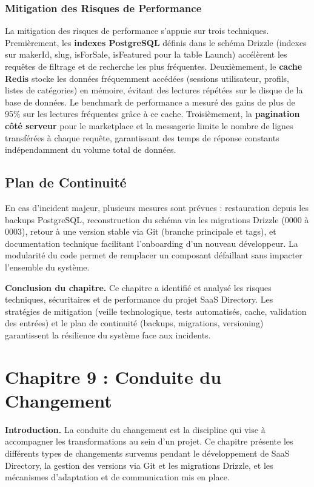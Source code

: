 \subsubsection{Mitigation des Risques de Performance}

La mitigation des risques de performance s'appuie sur trois techniques. Premièrement, les \textbf{indexes PostgreSQL} définis dans le schéma Drizzle (indexes sur makerId, slug, isForSale, isFeatured pour la table Launch) accélèrent les requêtes de filtrage et de recherche les plus fréquentes. Deuxièmement, le \textbf{cache Redis} stocke les données fréquemment accédées (sessions utilisateur, profils, listes de catégories) en mémoire, évitant des lectures répétées sur le disque de la base de données. Le benchmark de performance a mesuré des gains de plus de 95\% sur les lectures fréquentes grâce à ce cache. Troisièmement, la \textbf{pagination côté serveur} pour le marketplace et la messagerie limite le nombre de lignes transférées à chaque requête, garantissant des temps de réponse constants indépendamment du volume total de données.

\subsection{Plan de Continuité}

En cas d'incident majeur, plusieurs mesures sont prévues : restauration depuis les backups PostgreSQL, reconstruction du schéma via les migrations Drizzle (0000 à 0003), retour à une version stable via Git (branche principale et tags), et documentation technique facilitant l'onboarding d'un nouveau développeur. La modularité du code permet de remplacer un composant défaillant sans impacter l'ensemble du système.

\textbf{Conclusion du chapitre.} Ce chapitre a identifié et analysé les risques techniques, sécuritaires et de performance du projet SaaS Directory. Les stratégies de mitigation (veille technologique, tests automatisés, cache, validation des entrées) et le plan de continuité (backups, migrations, versioning) garantissent la résilience du système face aux incidents.


\section{Chapitre 9 : Conduite du Changement}

\textbf{Introduction.} La conduite du changement est la discipline qui vise à accompagner les transformations au sein d'un projet. Ce chapitre présente les différents types de changements survenus pendant le développement de SaaS Directory, la gestion des versions via Git et les migrations Drizzle, et les mécanismes d'adaptation et de communication mis en place.

